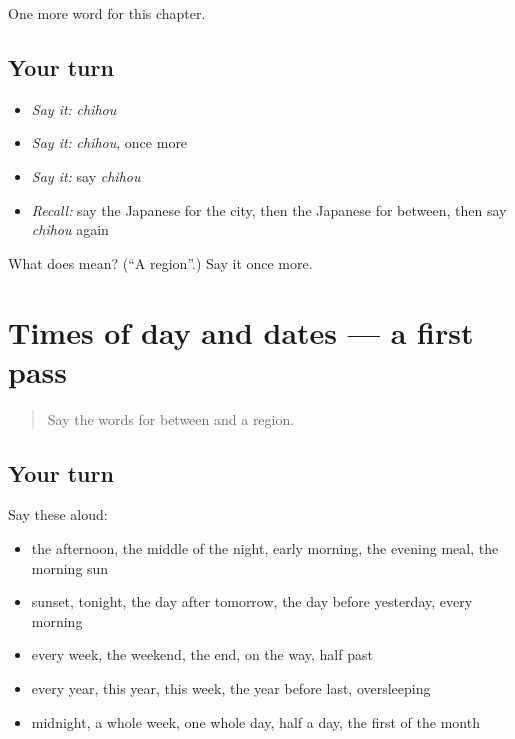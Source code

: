 \begin{grammarlens}[title={What you've built}]
One more word for this chapter.
\end{grammarlens}

\subsection*{Your turn}
\begin{itemize}
\raggedright
  \item \emph{Say it:} \emph{chihou}
  \item \emph{Say it:} \emph{chihou}, once more
  \item \emph{Say it:} say \emph{chihou}
  \item \emph{Recall:} say the Japanese for the city, then the Japanese for between, then say \emph{chihou} again
\end{itemize}

\begin{tcolorbox}[breakable,colback=teal!4,colframe=teal!35!black,title={Before you move on}]
What does  mean? (\textquotedblleft{}A region\textquotedblright{}.) Say it once more.
\end{tcolorbox}
\section[(dialogue)]{Times of day and dates — a first pass}

\label{lesson:JA-R81-first-pass-times-of-day-and-dates}



\begin{quote}
Say the words for between and a region.
\end{quote}

\subsection*{Your turn}
Say these aloud:

\begin{itemize}
\raggedright
  \item the afternoon, the middle of the night, early morning, the evening meal, the morning sun
  \item sunset, tonight, the day after tomorrow, the day before yesterday, every morning
  \item every week, the weekend, the end, on the way, half past
  \item every year, this year, this week, the year before last, oversleeping
  \item midnight, a whole week, one whole day, half a day, the first of the month
\end{itemize}

